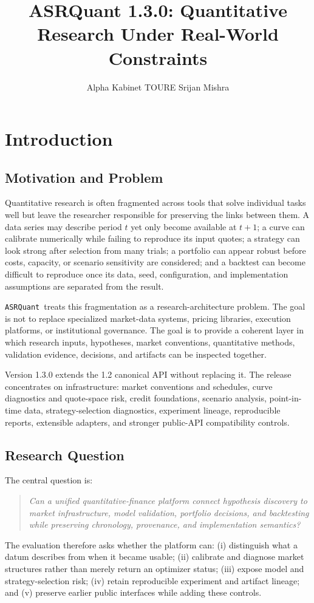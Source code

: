 \documentclass{asrpaper}
\title{ASRQuant 1.3.0: Quantitative Research Under Real-World Constraints}
\author{Alpha Kabinet TOURE \quad Srijan Mishra}
\newcommand{\pkg}{\texttt{ASRQuant}}
\begin{document}
\ASRMakeTitle
\section{Introduction}
\subsection{Motivation and Problem}
Quantitative research is often fragmented across tools that solve individual tasks well but leave the researcher responsible for preserving the links between them. A data series may describe period $t$ yet only become available at $t+1$; a curve can calibrate numerically while failing to reproduce its input quotes; a strategy can look strong after selection from many trials; a portfolio can appear robust before costs, capacity, or scenario sensitivity are considered; and a backtest can become difficult to reproduce once its data, seed, configuration, and implementation assumptions are separated from the result.

\pkg\ treats this fragmentation as a research-architecture problem. The goal is not to replace specialized market-data systems, pricing libraries, execution platforms, or institutional governance. The goal is to provide a coherent layer in which research inputs, hypotheses, market conventions, quantitative methods, validation evidence, decisions, and artifacts can be inspected together.

Version 1.3.0 extends the 1.2 canonical API without replacing it. The release concentrates on infrastructure: market conventions and schedules, curve diagnostics and quote-space risk, credit foundations, scenario analysis, point-in-time data, strategy-selection diagnostics, experiment lineage, reproducible reports, extensible adapters, and stronger public-API compatibility controls.

\subsection{Research Question}
The central question is:
\begin{quote}\itshape
Can a unified quantitative-finance platform connect hypothesis discovery to market infrastructure, model validation, portfolio decisions, and backtesting while preserving chronology, provenance, and implementation semantics?
\end{quote}

The evaluation therefore asks whether the platform can: (i) distinguish what a datum describes from when it became usable; (ii) calibrate and diagnose market structures rather than merely return an optimizer status; (iii) expose model and strategy-selection risk; (iv) retain reproducible experiment and artifact lineage; and (v) preserve earlier public interfaces while adding these controls.
\end{document}
